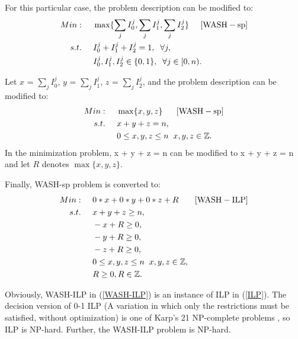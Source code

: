 \documentclass[conference]{IEEEtran}
\begin{document}
For this particular case, the problem description can be modified to:
\begin{align}
Min:&\;\;\;\;\;\max\{\sum_{j}I_0^j, \sum_{j}I_1^j, \sum_{j}I_2^j\}\;\;\;\;\;[\rm{WASH-sp}]\\
s.t. 
&\;\;\;\;\;I_0^j + I_1^j +I_2^j= 1,\;\;\forall j,\nonumber\\
&\;\;\;\;\;I_0^j, I_1^j, I_2^j\in\{0,1\},\;\;\forall j \in[0,n).\nonumber
\end{align}

Let  $x$ = $\sum_{j}I_0^j$, $y$ = $\sum_{j}I_1^j$, $z$ = $\sum_{j}I_2^j$, and the problem description can be modified to:
\begin{align}
Min:&\;\;\;\;\;\max\{x,y,z\}\;\;\;\;\;\;[\rm{WASH-sp}]\\
s.t. 
&\;\;\;\;\;x + y + z = n,\;\label{enlarge-cons}\\
&\;\;\;\;\;0 \leq x, y, z \leq n  \;\;x, y, z\in\mathbb{Z}.\nonumber
\end{align}
In the minimization problem, x + y + z = n can be modified to x + y + z = n and let $R$ denotes $\max\{x,y,z\}$. 

Finally, WASH-sp problem is converted to:
\begin{align}
Min:&\;\;\;\;\;0*x+0*y+0*z+R\;\;\;\;\;\;\;[\rm{WASH-ILP}]\label{WASH-ILP}\\
s.t. 
&\;\;\;\;\;x + y + z \geq n,\;\nonumber\\
&\;\;\;\;\;-x + R \geq 0, \nonumber\\
&\;\;\;\;\;-y + R \geq 0, \nonumber\\
&\;\;\;\;\;-z + R \geq 0, \nonumber\\
&\;\;\;\;\;0 \leq x, y, z \leq n  \;\;x, y, z\in\mathbb{Z},\nonumber\\
&\;\;\;\;\;R \geq 0, R\in\mathbb{Z}.\nonumber
\end{align}

Obviously, WASH-ILP in (\ref{WASH-ILP}) is an instance of ILP in (\ref{ILP}). The decision version of 0-1 ILP (A variation in which only the restrictions must be satisfied, without optimization) is one of Karp's 21 NP-complete problems  \cite{b9}, so ILP is NP-hard. Further, the WASH-ILP problem is NP-hard.
\end{document}
